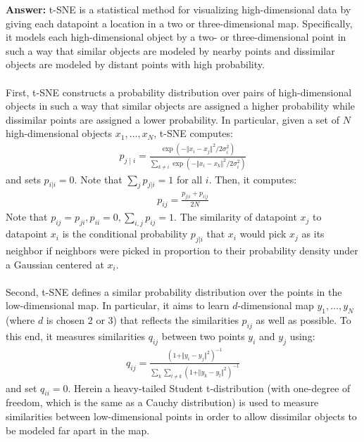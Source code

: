 \documentclass{article}
\newenvironment{QandA}{\begin{enumerate}[label=\arabic*.]}{\end{enumerate}}
\newenvironment{answer}{\par\normalfont \textbf{Answer:}}{}
\begin{document}
\begin{QandA}
    \begin{answer}
        t-SNE is a statistical method for visualizing high-dimensional data by giving each datapoint a location in a two or three-dimensional map. Specifically, it models each high-dimensional object by a two- or three-dimensional point in such a way that similar objects are modeled by nearby points and dissimilar objects are modeled by distant points with high probability. \\\\
        First, t-SNE constructs a probability distribution over pairs of high-dimensional objects in such a way that similar objects are assigned a higher probability while dissimilar points are assigned a lower probability. In particular, given a set of $N$ high-dimensional objects $x_1, \ldots, x_N$, t-SNE computes:
        \begin{align*}
            p_{j \mid i} = \frac{\exp(- \Vert x_i - x_j\Vert^2/2\sigma_i^2)}{\sum_{k \neq i} \exp(- \Vert x_i - x_k\Vert^2/2\sigma_i^2)}
        \end{align*}
        and sets $p_{i \vert i} = 0$. Note that $\sum_j p_{j \vert i} = 1$ for all $i$. Then, it computes:
        \begin{align*}
            p_{ij} = \frac{p_{j \vert i} + p_{i \vert j}}{2N}
        \end{align*}
    Note that $p_{ij} = p_{ji}, p_{ii} = 0, \sum_{i,j} p_{ij} = 1$. The similarity of datapoint $x_j$ to datapoint $x_i$ is the conditional probability $p_{j \vert i}$ that $x_i$ would pick $x_j$ as its neighbor if neighbors were picked in proportion to their probability density under a Gaussian centered at $x_i$. \\\\
    Second, t-SNE defines a similar probability distribution over the points in the low-dimensional map. In particular, it aims to learn $d$-dimensional map $y_1, \ldots, y_N$ (where $d$ is chosen 2 or 3) that reflects the similarities $p_{ij}$ as well as possible. To this end, it measures similarities $q_{ij}$ between two points $y_i$ and $y_j$ using:
    \begin{align*}
        q_{ij} = \frac{(1 + \Vert y_i - y_j \Vert^2)^{-1}}{\sum_k \sum_{l \neq k} (1 + \Vert y_k - y_l \Vert^2)^{-1}}
    \end{align*}
    and set $q_{ii} = 0$. Herein a heavy-tailed Student t-distribution (with one-degree of freedom, which is the same as a Cauchy distribution) is used to measure similarities between low-dimensional points in order to allow dissimilar objects to be modeled far apart in the map. \\\\

\end{answer}
\end{QandA}
\end{document}

